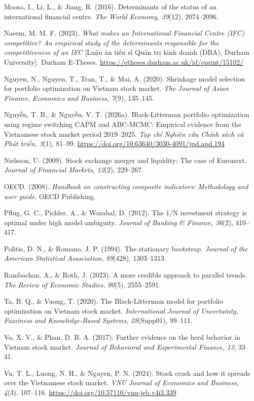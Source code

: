 \begin{list}{}{\setlength{\leftmargin}{1.5em}\setlength{\itemindent}{-1.5em}\setlength{\itemsep}{2pt}\small}
\item Moosa, I., Li, L., \& Jiang, R. (2016). Determinants of the status of an international financial centre. \emph{The World Economy, 39}(12), 2074–2096.
\item Naeem, M. M. F. (2023). \emph{What makes an International Financial Centre (IFC) competitive? An empirical study of the determinants responsible for the competitiveness of an IFC} [Luận án tiến sĩ Quản trị kinh doanh (DBA), Durham University]. Durham E-Theses. \url{https://etheses.durham.ac.uk/id/eprint/15102/}
\item Nguyen, N., Nguyen, T., Tran, T., \& Mai, A. (2020). Shrinkage model selection for portfolio optimization on Vietnam stock market. \emph{The Journal of Asian Finance, Economics and Business, 7}(9), 135–145.
\item Nguyễn, T. B., \& Nguyễn, V. T. (2026a). Black-Litterman portfolio optimization using regime switching CAPM and ABC-MCMC: Empirical evidence from the Vietnamese stock market period 2019–2025. \emph{Tạp chí Nghiên cứu Chính sách và Phát triển, 3}(1), 81–99. \url{https://doi.org/10.63640/3030-4091/jpd.apd.194}
\item Nielsson, U. (2009). Stock exchange merger and liquidity: The case of Euronext. \emph{Journal of Financial Markets, 12}(2), 229–267.
\item OECD. (2008). \emph{Handbook on constructing composite indicators: Methodology and user guide}. OECD Publishing.
\item Pflug, G. C., Pichler, A., \& Wozabal, D. (2012). The 1/N investment strategy is optimal under high model ambiguity. \emph{Journal of Banking \& Finance, 36}(2), 410–417.
\item Politis, D. N., \& Romano, J. P. (1994). The stationary bootstrap. \emph{Journal of the American Statistical Association, 89}(428), 1303–1313.
\item Rambachan, A., \& Roth, J. (2023). A more credible approach to parallel trends. \emph{The Review of Economic Studies, 90}(5), 2555–2591.
\item Ta, B. Q., \& Vuong, T. (2020). The Black-Litterman model for portfolio optimization on Vietnam stock market. \emph{International Journal of Uncertainty, Fuzziness and Knowledge-Based Systems, 28}(Supp01), 99–111.
\item Vo, X. V., \& Phan, D. B. A. (2017). Further evidence on the herd behavior in Vietnam stock market. \emph{Journal of Behavioral and Experimental Finance, 13}, 33–41.
\item Vu, T. L., Luong, N. H., \& Nguyen, P. N. (2024). Stock crash and how it spreads over the Vietnamese stock market. \emph{VNU Journal of Economics and Business, 4}(3), 107–116. \url{https://doi.org/10.57110/vnu-jeb.v4i3.339}

\end{list}
